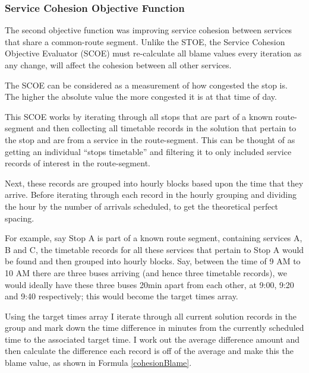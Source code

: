 \documentclass{article}
\begin{document}
\subsubsection{Service Cohesion Objective Function}
\label{SCOE}
The second objective function was improving service cohesion between services that share a common-route segment. Unlike the STOE, the Service Cohesion Objective Evaluator (SCOE) must re-calculate all blame values every iteration as any change, will affect the cohesion between all other services.

\par 
The SCOE can be considered as a measurement of how congested the stop is. The higher the absolute value the more congested it is at that time of day.


\par 
This SCOE works by iterating through all stops that are part of a known route-segment and then collecting all timetable records in the solution that pertain to the stop and are from a service in the route-segment. This can be thought of as getting an individual ``stops timetable'' and filtering it to only included service records of interest in the route-segment.


\par 
Next, these records are grouped into hourly blocks based upon the time that they arrive. Before iterating through each record in the hourly grouping and dividing the hour by the number of arrivals scheduled, to get the theoretical perfect spacing.

\par 
For example, say Stop A is part of a known route segment, containing services A, B and C, the timetable records for all these services that pertain to Stop A would be found and then grouped into hourly blocks. Say, between the time of 9 AM to 10 AM there are three buses arriving (and hence three timetable records), we would ideally have these three buses 20min apart from each other, at 9:00, 9:20 and 9:40 respectively; this would become the target times array.

\par 
Using the target times array I iterate through all current solution records in the group and mark down the time difference in minutes from the currently scheduled time to the associated target time. I work out the average difference amount and then calculate the difference each record is off of the average and make this the blame value, as shown in Formula \ref{cohesionBlame}.
\end{document}
